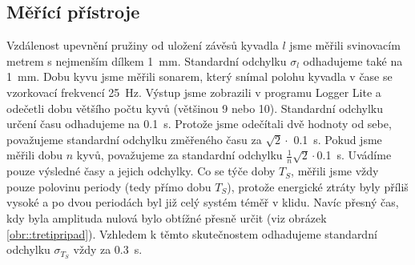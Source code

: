 \subsection*{Měřící přístroje}
Vzdálenost upevnění pružiny od uložení závěsů kyvadla $l$ jsme měřili svinovacím metrem s nejmenším dílkem \SI{1}{\mm}. Standardní odchylku $\sigma_l$ odhadujeme také na \SI{1}{\mm}.
Dobu kyvu jsme měřili sonarem, který snímal polohu kyvadla v čase se vzorkovací frekvencí \SI{25}{\Hz}. Výstup jsme zobrazili v programu Logger Lite a odečetli dobu většího počtu kyvů (většinou 9 nebo 10). Standardní odchylku určení času odhadujeme na \SI{0,1}{\s}. Protože jsme odečítali dvě hodnoty od sebe, považujeme standardní odchylku změřeného času za $\sqrt{2}\cdot$ \SI{0,1}{\s}. Pokud jsme měřili dobu $n$ kyvů, považujeme za standardní odchylku $\frac{1}{n} \sqrt{2} \cdot$\SI{0,1}{\s}. Uvádíme pouze výsledné časy a jejich odchylky.
Co se týče doby $T_S$, měřili jsme vždy pouze polovinu periody (tedy přímo dobu $T_S$), protože energické ztráty byly příliš vysoké a po dvou periodách byl již celý systém téměř v klidu. Navíc přesný čas, kdy byla amplituda nulová bylo obtížné přesně určit (viz obrázek \ref{obr::tretipripad}). Vzhledem k těmto skutečnostem odhadujeme standardní odchylku $\sigma_{T_S}$ vždy za \SI{0,3}{s}.